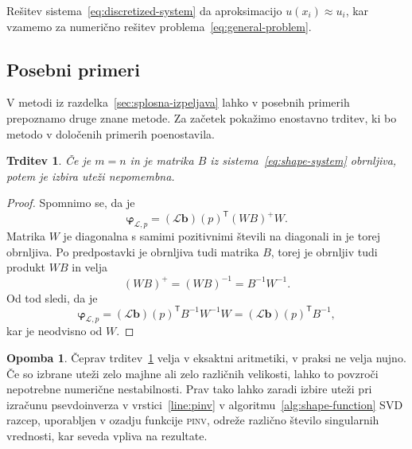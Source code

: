 \documentclass[12pt,a4paper,twoside]{article}
\theoremstyle{definition} %
\newtheorem{opomba}[definicija]{Opomba}
\theoremstyle{plain} %
\newtheorem{trditev}[definicija]{Trditev}
\numberwithin{equation}{section}
\renewcommand{\L}{\mathcal{L}}
\newcommand{\T}{\mathsf{T}}
\renewcommand{\b}{\boldsymbol}
\renewcommand{\phi}{\varphi}
\begin{document}
Rešitev sistema~\eqref{eq:discretized-system} da aproksimacijo $u(x_i) \approx u_i$, kar vzamemo
za numerično rešitev problema~\eqref{eq:general-problem}.

\subsection{Posebni primeri}
\label{sec:posebni-primeri}
V metodi iz razdelka~\ref{sec:splosna-izpeljava} lahko v posebnih primerih prepoznamo druge znane
metode. Za začetek pokažimo enostavno trditev, ki bo metodo v določenih primerih poenostavila.
\begin{trditev}
  \label{trd:weight-independence}
  Če je $m = n$ in je matrika $B$ iz sistema~\eqref{eq:shape-system} obrnljiva,
  potem je izbira uteži nepomembna.
\end{trditev}
\begin{proof}
Spomnimo se, da je \[
  \b\phi_{\L, p} = (\L\b{b})(p)^\T(WB)^{+}W.
\]
Matrika $W$ je diagonalna s samimi pozitivnimi števili na diagonali in je torej
obrnljiva. Po predpostavki je obrnljiva tudi matrika $B$, torej je obrnljiv tudi
produkt $WB$ in velja
\[
  (WB)^+ = (WB)^{-1} = B^{-1}W^{-1}.
\]
Od tod sledi, da je
\[
  \b\phi_{\L, p} = (\L\b{b})(p)^\T B^{-1} W^{-1} W = (\L\b{b})(p)^\T B^{-1},
\]
kar je neodvisno od $W$.
\end{proof}
\begin{opomba}
  Čeprav trditev~\ref{trd:weight-independence} velja v eksaktni aritmetiki, v
  praksi ne velja nujno. Če so izbrane uteži zelo majhne ali zelo različnih
  velikosti, lahko to povzroči nepotrebne numerične nestabilnosti. Prav tako
  lahko zaradi izbire uteži pri izračunu psevdoinverza v vrstici~\ref{line:pinv}
  v algoritmu~\ref{alg:shape-function} SVD razcep, uporabljen v ozadju
  funkcije \textsc{pinv}, odreže različno število singularnih vrednosti,
  kar seveda vpliva na rezultate.
\end{opomba}
\end{document}
